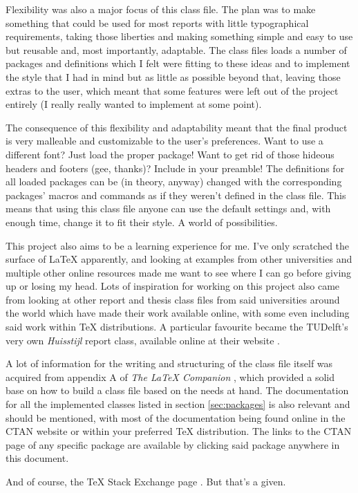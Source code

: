 \documentclass[palatino,english]{ist-report}
\begin{document}
Flexibility was also a major focus of this class file. The plan was to make something that could be used for most reports with little typographical requirements, taking those liberties and making something simple and easy to use but reusable and, most importantly, adaptable. The class files loads a number of packages and definitions which I felt were fitting to these ideas and to implement the style that I had in mind but as little as possible beyond that, leaving those extras to the user, which meant that some features were left out of the project entirely (I really really wanted to implement  at some point).

The consequence of this flexibility and adaptability meant that the final product is very malleable and customizable to the user's preferences. Want to use a different font? Just load the proper package! Want to get rid of those hideous headers and footers (gee, thanks)? Include \texttt{\fancyhf{}} in your preamble! The definitions for all loaded packages can be (in theory, anyway) changed with the corresponding packages' macros and commands as if they weren't defined in the class file. This means that using this class file anyone can use the default settings and, with enough time, change it to fit their style. A world of possibilities.

This project also aims to be a learning experience for me. I've only scratched the surface of \LaTeX{} apparently, and looking at examples from other universities and multiple other online resources made me want to see where I can go before giving up or losing my head. Lots of inspiration for working on this project also came from looking at other report and thesis class files from said universities around the world which have made their work available online, with some even including said work within \TeX{} distributions. A particular favourite became the TUDelft's very own \textit{Huisstijl} report class, available online at their website \cite{tudelft-huisstijl}.

A lot of information for the writing and structuring of the class file itself was acquired from appendix A of \textit{The \LaTeX{} Companion} \cite{latex-companion}, which provided a solid base on how to build a class file based on the needs at hand. The documentation for all the implemented classes listed in section \ref{sec:packages} is also relevant and should be mentioned, with most of the documentation being found online in the CTAN website \cite{ctan} or within your preferred \TeX{} distribution. The links to the CTAN page of any specific package are available by clicking said package anywhere in this document.
\medskip\par
And of course, the \TeX{} Stack Exchange page \cite{texsx}. But that's a given.
\end{document}
